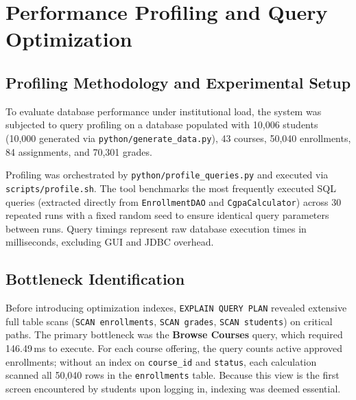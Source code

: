 \section{Performance Profiling and Query Optimization}
\label{sec:profiling}

\subsection{Profiling Methodology and Experimental Setup}
To evaluate database performance under institutional load, the system was subjected to query profiling on a database populated with 10{,}006 students (10{,}000 generated via \texttt{python/generate\_data.py}), 43 courses, 50{,}040 enrollments, 84 assignments, and 70{,}301 grades.

Profiling was orchestrated by \texttt{python/profile\_queries.py} and executed via \texttt{scripts/profile.sh}. The tool benchmarks the most frequently executed SQL queries (extracted directly from \texttt{EnrollmentDAO} and \texttt{CgpaCalculator}) across 30 repeated runs with a fixed random seed to ensure identical query parameters between runs. Query timings represent raw database execution times in milliseconds, excluding GUI and JDBC overhead.

\subsection{Bottleneck Identification}
Before introducing optimization indexes, \texttt{EXPLAIN QUERY PLAN} revealed extensive full table scans (\texttt{SCAN enrollments}, \texttt{SCAN grades}, \texttt{SCAN students}) on critical paths. The primary bottleneck was the \textbf{Browse Courses} query, which required 146.49\,ms to execute. For each course offering, the query counts active approved enrollments; without an index on \texttt{course\_id} and \texttt{status}, each calculation scanned all 50{,}040 rows in the \texttt{enrollments} table. Because this view is the first screen encountered by students upon logging in, indexing was deemed essential.

